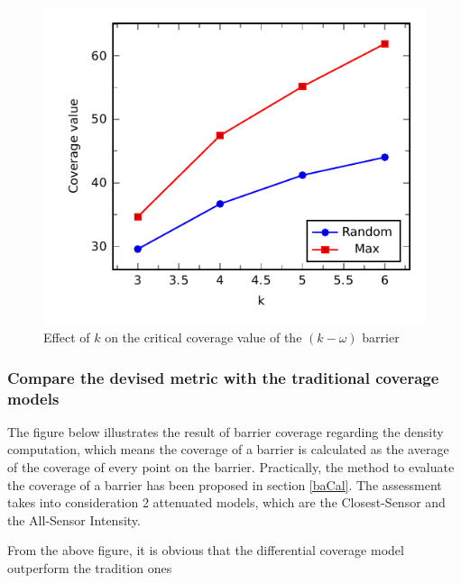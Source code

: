 \begin{figure}[h]
	\centering
	\includegraphics[scale=1.]{Hinhanh/kEffect/main.pdf}
	\caption{Effect of $k$ on the critical coverage value of the $(k-\omega)$ barrier}
	\label{fig:}
\end{figure}

\subsubsection{Compare the devised metric with the traditional coverage models}
The figure below illustrates the result of barrier coverage regarding the density computation, which means the coverage of a barrier is calculated as the average of the coverage of every point on the barrier. Practically, the method to evaluate the coverage of a barrier has been proposed in section \ref{baCal}. The assessment takes into consideration 2 attenuated models, which are the Closest-Sensor and the All-Sensor Intensity.

From the above figure, it is obvious that the differential coverage model outperform the tradition ones